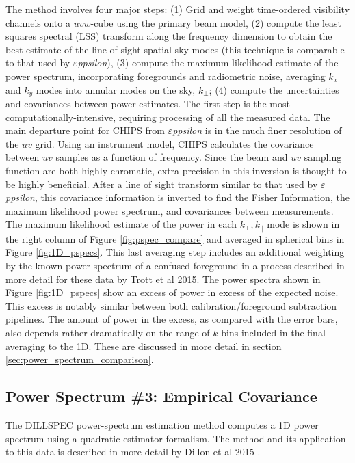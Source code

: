 \documentclass[twolcolumn,iop]{emulateapj}
\def\eppsilon{{\it $\varepsilon$ppsilon}}
\def\empirical{DILLSPEC}
\def\chipscite{Trott et al 2015}
\def\dilloncite{Dillon et al 2015 }
\begin{document}
The method involves four major steps: (1) Grid and weight time-ordered visibility channels onto a $uvw$-cube using the primary beam model, (2) compute the least squares spectral (LSS) transform along the frequency dimension to obtain the best estimate of the line-of-sight spatial sky modes (this technique is comparable to that used by \eppsilon), (3) compute the maximum-likelihood estimate of the power spectrum, incorporating foregrounds and radiometric noise,  averaging $k_x$ and $k_y$ modes into annular modes on the sky, $k_\bot$; (4) compute the uncertainties and covariances between power estimates. The first step is the most computationally-intensive, requiring processing of all the measured data. The main departure point for CHIPS from \eppsilon{} is in the much finer resolution of the $uv$ grid.  Using an instrument model, CHIPS calculates the covariance between $uv$ samples as a function of frequency.  Since the beam and $uv$ sampling function are both highly chromatic, extra precision in this inversion is thought to be highly beneficial. After a line of sight transform similar to that used by \eppsilon{}, this covariance information is inverted to find the Fisher Information, the maximum likelihood power spectrum, and covariances between measurements.  The maximum likelihood estimate of the power in each $k_\bot,k_\parallel$ mode is shown in the right column of Figure \ref{fig:pspec_compare} and averaged in spherical bins in Figure \ref{fig:1D_pspecs}. This last averaging step includes an additional weighting by the known power spectrum of a confused foreground in a process described in more detail for these data by \chipscite{}. The power spectra shown in Figure \ref{fig:1D_pspecs} show an excess of power in excess of the expected noise. This excess is notably similar between both calibration/foreground subtraction pipelines. The amount of power in the excess, as compared with the error bars, also depends rather dramatically on the range of $k$ bins included in the final averaging to the 1D.  These are discussed in more detail in section \ref{sec:power_spectrum_comparison}.

\subsection{Power Spectrum \#3: Empirical Covariance}
\label{sec:empirical_cov}

The \empirical{} power-spectrum estimation method computes a 1D power spectrum using a quadratic estimator formalism. The method and its application to this data is described in more detail by \dilloncite{}.
\end{document}
